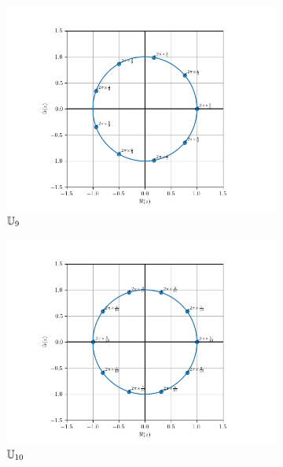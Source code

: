 \begin{figure}
\begin{subfigure}{.3\textwidth}
        \includegraphics[scale=.33]{U_9.png}  
        \caption{$\mathbb{U}_9$}
        \label{fig:U9}      
    \end{subfigure}
    \begin{subfigure}{.3\textwidth}
        \centering
        \includegraphics[scale=.33]{U_10.png}  
        \caption{$\mathbb{U}_{10}$}
        \label{fig:U10}
    \end{subfigure}  
    \begin{subfigure}{.3\textwidth}
        \centering

\end{subfigure}
\end{figure}
